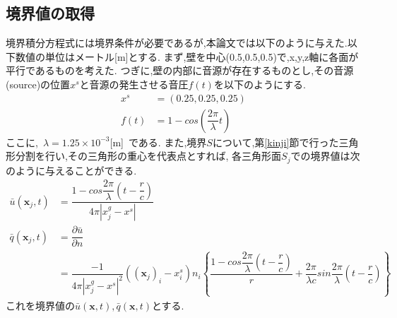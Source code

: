 \documentclass[dvipdfmx]{ampbt}
\begin{document}
\subsection{境界値の取得}
\label{境界値の取得}
境界積分方程式には境界条件が必要であるが,本論文では以下のように与えた.以下数値の単位はメートル[m]とする.
まず,壁を中心(0.5,0.5,0.5)で,x,y,z軸に各面が平行であるものを考えた.
つぎに,壁の内部に音源が存在するものとし,その音源(source)の位置$x^s$と音源の発生させる音圧$f(t)$を以下のようにする.
\begin{align}
x^s &= (0.25,0.25,0.25)\\
\label{ef:f(t)}
f(t) &= 1-cos(\dfrac{2 \pi}{\lambda}t)
\end{align}
ここに,\ $\lambda = 1.25 \times 10^{-3}$[m]\ である.
また,境界$S$について,第\ref{kinji}節で行った三角形分割を行い,その三角形の重心を代表点とすれば,
各三角形面$S_j$での境界値は次のように与えることができる.
\begin{align}
\bar{u}(\bm{x}_j,t) &= \dfrac{1-cos\dfrac{2 \pi}{\lambda}(t-\dfrac{r}{c})}{4\pi|x^g_j-x^s|} \\
\bar{q}(\bm{x}_j,t) &= \dfrac{\partial \bar{u}}{\partial n} \nonumber \\
               &= \dfrac{-1}{4\pi|x^g_j-x^s|^2}((\bm{x}_j)_i-x^s_i)n_i \left\{ \dfrac{1-cos\dfrac{2 \pi}{\lambda}(t-\dfrac{r}{c})}{r} + \dfrac{2\pi}{\lambda c} sin\dfrac{2\pi}{\lambda}(t-\dfrac{r}{c})  \right\}
\end{align}
これを境界値の$\bar{u}(\bm{x},t),\bar{q}(\bm{x},t)$とする.
\end{document}
